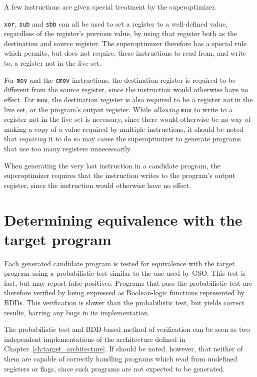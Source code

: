 \documentclass[a4paper,11pt]{kth-mag}
\begin{document}
A few instructions are given special treatment by the superoptimizer.

\verb|xor|, \verb|sub| and \verb|sbb| can all be used to set a register to a well-defined value, regardless of the register's previous value, by using that register both as the destination and source register.
The superoptimizer therefore has a special rule which permits, but does not require, these instructions to read from, and write to, a register not in the live set.


For \verb|mov| and the \verb|cmov| instructions, the destination register is required to be different from the source register, since the instruction would otherwise have no effect.
For \verb|mov|, the destination register is also required to be a register \emph{not} in the live set, or the program's output register.
While \emph{allowing} \verb|mov| to write to a register not in the live set is necessary, since there would otherwise be no way of making a copy of a value required by multiple instructions,
it should be noted that \emph{requiring} it to do so may cause the superoptimizer to generate programs that use too many registers unnecessarily.

When generating the very last instruction in a candidate program, the superoptimizer requires that the instruction writes to the program's output register, since the instruction would otherwise have no effect.


\section{Determining equivalence with the target program}

Each generated candidate program is tested for equivalence with the target program using a probabilistic test similar to the one used by GSO.
This test is fast, but may report false positives.
Programs that pass the probabilistic test are therefore verified by being expressed as Boolean-logic functions represented by BDDs.
This verification is slower than the probabilistic test, but yields correct results, barring any bugs in its implementation.

The probabilistic test and BDD-based method of verification can be seen as two independent implementations of the architecture defined in Chapter~\ref{ch:target_architecture}.
If should be noted, however, that neither of them are capable of correctly handling programs which read from undefined registers or flags, since such programs are not expected to be generated.
\end{document}
